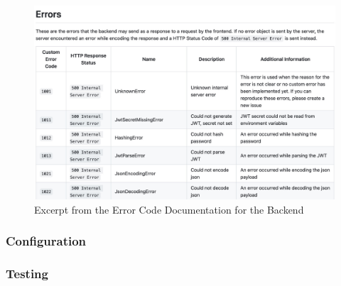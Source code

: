 \begin{figure}[htbp]
  \centering{}
  \includegraphics[width=\textwidth]{images/errors_documentation.jpg}
  \caption{Excerpt from the Error Code Documentation for the Backend}
  \label{fig:error_code_documentation}
\end{figure}

\subsubsection{Configuration}

\subsubsection{Testing}
